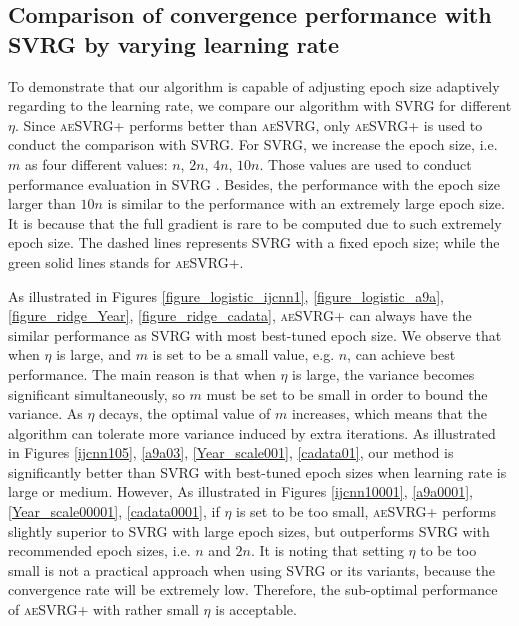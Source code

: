 \documentclass[conference]{IEEEtran}
\begin{document}
 \subsection{Comparison of convergence performance with SVRG by varying learning rate}
 To demonstrate that our algorithm is capable of adjusting epoch size adaptively regarding to the learning rate, we compare our algorithm with SVRG for different $\eta$.
Since \textsc{aeSVRG+} performs better than \textsc{aeSVRG}, only \textsc{aeSVRG+} is used to conduct the comparison with SVRG. For SVRG, we increase the epoch size, i.e. $m$ as four different values: $n$, $2n$, $4n$, $10n$. Those values are used to conduct performance evaluation in SVRG \citep{Johnson:9MAvkbgy}.  Besides, the performance with the epoch size larger than $10n$ is similar  to the performance with an extremely large epoch size. It is because that the full gradient is rare to be computed due to such extremely epoch size. The dashed lines represents SVRG with a fixed epoch size; while the green solid lines stands for \textsc{aeSVRG+}.

As illustrated in Figures \ref{figure_logistic_ijcnn1}, \ref{figure_logistic_a9a}, \ref{figure_ridge_Year}, \ref{figure_ridge_cadata},  \textsc{aeSVRG+} can always have the similar performance as SVRG with most best-tuned epoch size. We observe that when $\eta$ is large,  and $m$ is set to be a small value, e.g. $n$, can achieve best performance. The main reason is that when $\eta$ is large, the variance becomes significant simultaneously, so $m$ must be set to be small in order to bound the variance. As $\eta$ decays, the optimal value of $m$ increases, which means that the algorithm can tolerate more variance induced by extra iterations. As illustrated in Figures \ref{ijcnn105}, \ref{a9a03}, \ref{Year_scale001}, \ref{cadata01}, our method is significantly better than SVRG with best-tuned epoch sizes when learning rate is large or medium. However, As illustrated in Figures \ref{ijcnn10001}, \ref{a9a0001}, \ref{Year_scale00001}, \ref{cadata0001}, if $\eta$ is set to be too small, \textsc{aeSVRG+} performs slightly superior to  SVRG with large epoch sizes, but outperforms SVRG with recommended epoch sizes, i.e. $n$ and $2n$. It is noting that setting $\eta$ to be too small is not a practical approach when using SVRG or its variants, because the convergence rate will be extremely low. Therefore, the sub-optimal performance of \textsc{aeSVRG+} with rather small $\eta$ is acceptable.

 
\end{document}
